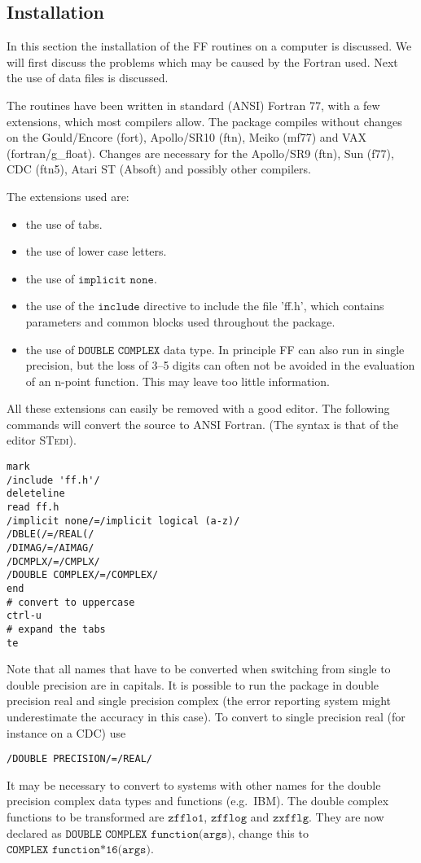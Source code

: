 \documentclass[twoside,12pt]{report}
\def\Code#1{\ensuremath{\texttt{#1}}}
\begin{document}
\begin{appendix}
\section{Installation}
\label{sc:installation}

In this section the installation of the FF routines on a computer is 
discussed.  We will first discuss the problems which may be caused by 
the Fortran used.  Next the use of data files is discussed.

The routines have been written in standard (ANSI) Fortran 77, with a few 
extensions, which most compilers allow.  The package compiles without 
changes on the Gould/Encore (fort), Apollo/SR10 (ftn), Meiko (mf77) and 
VAX (fortran/g\_float).  Changes are necessary for the Apollo/SR9 (ftn), 
Sun (f77), CDC (ftn5), Atari ST (Absoft) and possibly other compilers.

The extensions used are:
\begin{itemize}
\item the use of tabs.
\item the use of lower case letters.
\item the use of \Code{implicit none}.
\item the use of the \Code{include} directive to include the file 
  'ff.h', which contains parameters and common blocks used throughout 
  the package.

\item the use of \Code{DOUBLE COMPLEX} data type.  In principle FF can 
  also run in single precision, but the loss of 3--5 digits can often 
  not be avoided in the evaluation of an n-point function.  This may 
  leave too little information.
\end{itemize}
All these extensions can easily be removed with a good editor.  The 
following commands will convert the source to ANSI Fortran.  (The syntax 
is that of the editor \textsc{STedi}).
\begin{verbatim}
mark
/include 'ff.h'/
deleteline
read ff.h
/implicit none/=/implicit logical (a-z)/
/DBLE(/=/REAL(/
/DIMAG/=/AIMAG/
/DCMPLX/=/CMPLX/
/DOUBLE COMPLEX/=/COMPLEX/
end
# convert to uppercase
ctrl-u
# expand the tabs
te
\end{verbatim}
Note that all names that have to be converted when switching from single 
to double precision are in capitals.  It is possible to run the package 
in double precision real and single precision complex (the error 
reporting system might underestimate the accuracy in this case).  To 
convert to single precision real (for instance on a CDC) use
\begin{verbatim}
/DOUBLE PRECISION/=/REAL/
\end{verbatim}
It may be necessary to convert to systems with other names for the 
double precision complex data types and functions (e.g.~IBM).  The 
double complex functions to be transformed are \Code{zfflo1}, 
\Code{zfflog} and \Code{zxfflg}. They are now declared as \Code{DOUBLE 
COMPLEX function(args)}, change this to \Code{COMPLEX 
function*16(args)}.


\end{appendix}
\end{document}
